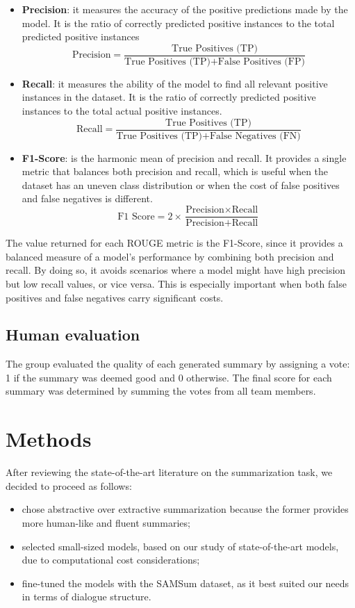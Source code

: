 \documentclass[10pt,twocolumn,letterpaper]{article}
\begin{document}
\begin{itemize}
    \item \textbf{Precision}: it measures the accuracy of the positive predictions made by the model. It is the ratio of correctly predicted positive instances to the total predicted positive instances \\
    \[ \text{Precision} = \frac{\text{True Positives (TP)}}{\text{True Positives (TP)} + \text{False Positives (FP)}} \]
    \item \textbf{Recall}: it measures the ability of the model to find all relevant positive instances in the dataset. It is the ratio of correctly predicted positive instances to the total actual positive instances. \\
    \[ \text{Recall} = \frac{\text{True Positives (TP)}}{\text{True Positives (TP)} + \text{False Negatives (FN)}} \]
    \item \textbf{F1-Score}: is the harmonic mean of precision and recall. It provides a single metric that balances both precision and recall, which is useful when the dataset has an uneven class distribution or when the cost of false positives and false negatives is different. \\
    \[ \text{F1 Score} = 2 \times \frac{\text{Precision} \times \text{Recall}}{\text{Precision} + \text{Recall}} \]
\end{itemize}
The value returned for each ROUGE metric is the F1-Score, since it provides a balanced measure of a model's performance by combining both precision and recall. By doing so, it avoids scenarios where a model might have high precision but low recall values, or vice versa. This is especially important when both false positives and false negatives carry significant costs.

\subsection{Human evaluation}
The group evaluated the quality of each generated summary by assigning a vote: 1 if the summary was deemed good and 0 otherwise. The final score for each summary was determined by summing the votes from all team members.

\section{Methods}
After reviewing the state-of-the-art literature on the summarization task, we decided to proceed as follows:
\begin{itemize}
    \item chose abstractive over extractive summarization because the former provides more human-like and fluent summaries;
    \item selected small-sized models, based on our study of state-of-the-art models, due to computational cost considerations;
    \item fine-tuned the models with the SAMSum dataset, as it best suited our needs in terms of dialogue structure.
\end{itemize}
\end{document}
